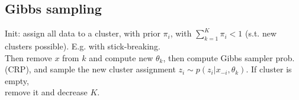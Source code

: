 \subsection*{Gibbs sampling}
Init: assign all data to a cluster, with prior $\pi_i$, with $\sum_{k=1}^K\pi_i<1$ (s.t. new clusters possible). E.g. with stick-breaking. \\
Then remove $x$ from $k$ and compute new $\theta_k$, then compute Gibbs sampler prob. (CRP), and sample the new cluster assignment $z_i\sim p(z_i|x_{-i},\theta_k)$. If cluster is empty, \\
remove it and decrease $K$.